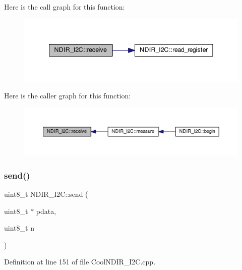 Here is the call graph for this function\+:\nopagebreak
\begin{figure}[H]
\begin{center}
\leavevmode
\includegraphics[width=342pt]{d6/ddb/class_n_d_i_r___i2_c_aa6d2b8dd287f9c9015461cebb18f9abc_cgraph}
\end{center}
\end{figure}
Here is the caller graph for this function\+:\nopagebreak
\begin{figure}[H]
\begin{center}
\leavevmode
\includegraphics[width=350pt]{d6/ddb/class_n_d_i_r___i2_c_aa6d2b8dd287f9c9015461cebb18f9abc_icgraph}
\end{center}
\end{figure}
\mbox{\label{class_n_d_i_r___i2_c_aab0c04c2b7d08e99d12af044df179f0c}} 
\subsubsection{\texorpdfstring{send()}{send()}}
{\footnotesize\ttfamily uint8\+\_\+t N\+D\+I\+R\+\_\+\+I2\+C\+::send (\begin{DoxyParamCaption}\item[{uint8\+\_\+t $\ast$}]{pdata,  }\item[{uint8\+\_\+t}]{n }\end{DoxyParamCaption})\hspace{0.3cm}{\ttfamily [private]}}



Definition at line 151 of file Cool\+N\+D\+I\+R\+\_\+\+I2\+C.\+cpp.


